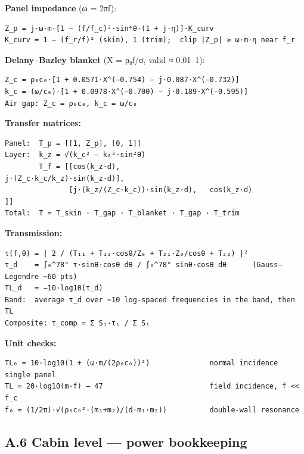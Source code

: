 \documentclass[10pt,a4paper]{article}
\begin{document}
\textbf{Panel impedance} (ω = 2πf):

\begin{Verbatim}[breaklines,fontsize=\small,frame=single,rulecolor=\color{gray}]
Z_p = j·ω·m·[1 − (f/f_c)²·sin⁴θ·(1 + j·η)]·K_curv
K_curv = 1 − (f_r/f)² (skin), 1 (trim);  clip |Z_p| ≥ ω·m·η near f_r
\end{Verbatim}

\textbf{Delany–Bazley blanket} (X = ρ₀f/σ, valid ≈ 0.01–1):

\begin{Verbatim}[breaklines,fontsize=\small,frame=single,rulecolor=\color{gray}]
Z_c = ρ₀c₀·[1 + 0.0571·X^(−0.754) − j·0.087·X^(−0.732)]
k_c = (ω/c₀)·[1 + 0.0978·X^(−0.700) − j·0.189·X^(−0.595)]
Air gap: Z_c = ρ₀c₀, k_c = ω/c₀
\end{Verbatim}

\textbf{Transfer matrices:}

\begin{Verbatim}[breaklines,fontsize=\small,frame=single,rulecolor=\color{gray}]
Panel:  T_p = [[1, Z_p], [0, 1]]
Layer:  k_z = √(k_c² − k₀²·sin²θ)
        T_f = [[cos(k_z·d),                     j·(Z_c·k_c/k_z)·sin(k_z·d)],
               [j·(k_z/(Z_c·k_c))·sin(k_z·d),   cos(k_z·d)               ]]
Total:  T = T_skin · T_gap · T_blanket · T_gap · T_trim
\end{Verbatim}

\textbf{Transmission:}

\begin{Verbatim}[breaklines,fontsize=\small,frame=single,rulecolor=\color{gray}]
τ(f,θ) = | 2 / (T₁₁ + T₁₂·cosθ/Z₀ + T₂₁·Z₀/cosθ + T₂₂) |²
τ_d    = ∫₀^78° τ·sinθ·cosθ dθ / ∫₀^78° sinθ·cosθ dθ      (Gauss–Legendre ~60 pts)
TL_d   = −10·log10(τ_d)
Band:  average τ_d over ~10 log-spaced frequencies in the band, then TL
Composite: τ_comp = Σ Sᵢ·τᵢ / Σ Sᵢ
\end{Verbatim}

\textbf{Unit checks:}

\begin{Verbatim}[breaklines,fontsize=\small,frame=single,rulecolor=\color{gray}]
TL₀ = 10·log10(1 + (ω·m/(2ρ₀c₀))²)              normal incidence single panel
TL ≈ 20·log10(m·f) − 47                         field incidence, f << f_c
f₀ = (1/2π)·√(ρ₀c₀²·(m₁+m₂)/(d·m₁·m₂))          double-wall resonance
\end{Verbatim}

\subsection*{A.6 Cabin level — power bookkeeping}
\end{document}
